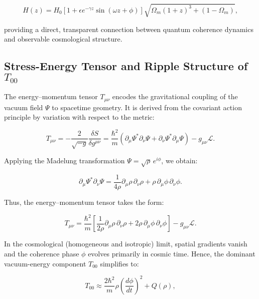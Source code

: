 \begin{equation}
H(z) = H_0\left[1 + \epsilon e^{-\gamma z}\sin(\omega z + \phi)\right]\sqrt{\Omega_m(1+z)^3+(1-\Omega_m)},
\label{eq:Hubble_ripple_appendix}
\end{equation}

providing a direct, transparent connection between quantum coherence dynamics and observable cosmological structure.

\subsection{Stress-Energy Tensor and Ripple Structure of \texorpdfstring{$T_{00}$}{T00}}
\label{app:tensor}

The energy–momentum tensor \( T_{\mu\nu} \) encodes the gravitational coupling of the vacuum field \( \Psi \) to spacetime geometry. It is derived from the covariant action principle by variation with respect to the metric:

\begin{equation}
T_{\mu\nu} = -\frac{2}{\sqrt{-g}} \frac{\delta S}{\delta g^{\mu\nu}} 
= \frac{\hbar^2}{m}\left(\partial_\mu\Psi^*\partial_\nu\Psi + \partial_\nu\Psi^*\partial_\mu\Psi\right) - g_{\mu\nu}\mathcal{L}.
\label{eq:stress_energy_general}
\end{equation}

Applying the Madelung transformation \( \Psi = \sqrt{\rho}\,e^{i\phi} \), we obtain:

\begin{equation}
\partial_\mu \Psi^*\partial_\nu\Psi = \frac{1}{4\rho}\partial_\mu\rho\,\partial_\nu\rho + \rho\,\partial_\mu\phi\,\partial_\nu\phi.
\label{eq:tmunu_madelung_term}
\end{equation}

Thus, the energy–momentum tensor takes the form:

\begin{equation}
T_{\mu\nu} = \frac{\hbar^2}{m}\left[\frac{1}{2\rho}\partial_\mu\rho\,\partial_\nu\rho + 2\rho\,\partial_\mu\phi\,\partial_\nu\phi\right] - g_{\mu\nu}\mathcal{L}.
\label{eq:stress_energy_expanded}
\end{equation}

In the cosmological (homogeneous and isotropic) limit, spatial gradients vanish and the coherence phase \(\phi\) evolves primarily in cosmic time. Hence, the dominant vacuum-energy component \(T_{00}\) simplifies to:

\begin{equation}
T_{00} \approx \frac{2\hbar^2}{m}\rho\left(\frac{d\phi}{dt}\right)^2 + Q(\rho),
\label{eq:t00_basic}
\end{equation}

